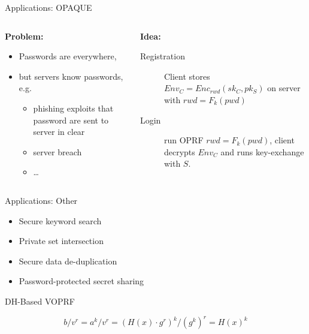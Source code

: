 \documentclass[xcolor=table,10pt,aspectratio=169]{beamer}
\begin{document}
\begin{frame}[label={sec:org4c89acc}]{Applications: OPAQUE}
\begin{columns}[t]
\begin{column}{0.5\columnwidth}
\textbf{Problem:}

\begin{itemize}
\item Passwords are everywhere,
\item but servers know passwords, e.g.
\begin{itemize}
\item phishing exploits that password are sent to server in clear
\item server breach
\item …
\end{itemize}
\end{itemize}
\end{column}

\begin{column}{0.5\columnwidth}
\textbf{Idea:}

\begin{description}
\item[{Registration}] Client stores \(Env_C = Enc_{rwd}(sk_C, pk_S)\) on server with \(rwd = F_k(pwd)\)
\item[{Login}] run OPRF \(rwd = F_k(pwd)\), client decrypts \(Env_C\) and runs key-exchange with \(S\).
\end{description}
\end{column}
\end{columns}

\vspace{1em}

\footnotesize
{}
\end{frame}

\begin{frame}[label={sec:org6d7fb96}]{Applications: Other}
\begin{itemize}
\item Secure keyword search 
\item Private set intersection 
\item Secure data de-duplication 
\item Password-protected secret sharing 
\end{itemize}
\end{frame}

\begin{frame}[label={sec:orgf5222ad}]{DH-Based VOPRF}
\centering
{}

\[b/v^r = a^k/v^r = (H(x) \cdot g^{r})^k/(g^k)^r = H(x)^k\]
\end{frame}
\end{document}
